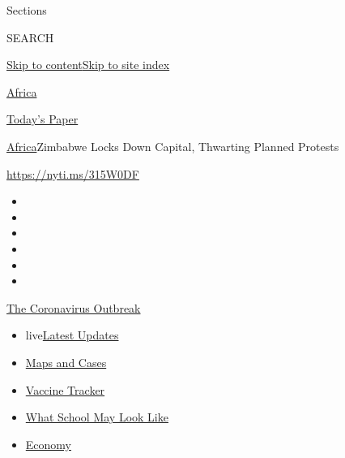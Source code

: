 Sections

SEARCH

\protect\hyperlink{site-content}{Skip to
content}\protect\hyperlink{site-index}{Skip to site index}

\href{https://www.nytimes3xbfgragh.onion/section/world/africa}{Africa}

\href{https://myaccount.nytimes3xbfgragh.onion/auth/login?response_type=cookie\&client_id=vi}{}

\href{https://www.nytimes3xbfgragh.onion/section/todayspaper}{Today's
Paper}

\href{/section/world/africa}{Africa}\textbar{}Zimbabwe Locks Down
Capital, Thwarting Planned Protests

\url{https://nyti.ms/315W0DF}

\begin{itemize}
\item
\item
\item
\item
\item
\item
\end{itemize}

\href{https://www.nytimes3xbfgragh.onion/news-event/coronavirus?action=click\&pgtype=Article\&state=default\&region=TOP_BANNER\&context=storylines_menu}{The
Coronavirus Outbreak}

\begin{itemize}
\tightlist
\item
  live\href{https://www.nytimes3xbfgragh.onion/2020/08/01/world/coronavirus-covid-19.html?action=click\&pgtype=Article\&state=default\&region=TOP_BANNER\&context=storylines_menu}{Latest
  Updates}
\item
  \href{https://www.nytimes3xbfgragh.onion/interactive/2020/us/coronavirus-us-cases.html?action=click\&pgtype=Article\&state=default\&region=TOP_BANNER\&context=storylines_menu}{Maps
  and Cases}
\item
  \href{https://www.nytimes3xbfgragh.onion/interactive/2020/science/coronavirus-vaccine-tracker.html?action=click\&pgtype=Article\&state=default\&region=TOP_BANNER\&context=storylines_menu}{Vaccine
  Tracker}
\item
  \href{https://www.nytimes3xbfgragh.onion/interactive/2020/07/29/us/schools-reopening-coronavirus.html?action=click\&pgtype=Article\&state=default\&region=TOP_BANNER\&context=storylines_menu}{What
  School May Look Like}
\item
  \href{https://www.nytimes3xbfgragh.onion/live/2020/07/31/business/stock-market-today-coronavirus?action=click\&pgtype=Article\&state=default\&region=TOP_BANNER\&context=storylines_menu}{Economy}
\end{itemize}

